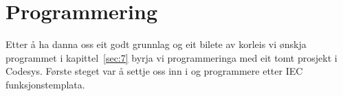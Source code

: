 \chapter{Programmering}
\thispagestyle{fancy}
Etter å ha danna oss eit godt grunnlag og eit bilete av korleis vi ønskja programmet i kapittel~\ref{sec:7} 
byrja vi programmeringa med eit tomt prosjekt i \gls{Codesys}. Første steget var å 
settje oss inn i og programmere etter \gls{IEC} funksjonstemplata.


